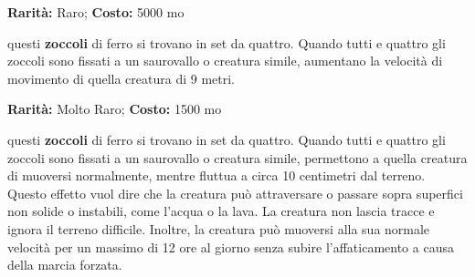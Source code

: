 \begin{multicols}{2}

\textbf{Rarità:} Raro; \textbf{Costo:} 5000 mo

questi \textbf{zoccoli} di ferro si trovano in set da quattro. Quando tutti e quattro gli zoccoli sono fissati a un saurovallo o creatura simile, aumentano la velocità di movimento di quella creatura di 9 metri.


\textbf{Rarità:} Molto Raro; \textbf{Costo:} 1500 mo

questi \textbf{zoccoli} di ferro si trovano in set da quattro. Quando tutti e quattro gli zoccoli sono fissati a un saurovallo o creatura simile, permettono a quella creatura di muoversi normalmente, mentre fluttua a circa 10 centimetri dal terreno. Questo effetto vuol dire che la creatura può attraversare o passare sopra superfici non solide o instabili, come l'acqua o la lava. La creatura non lascia tracce e ignora il terreno difficile. Inoltre, la creatura può muoversi alla sua normale velocità per un massimo di 12 ore al giorno senza subire l'affaticamento a causa della marcia forzata.

\end{multicols}






\pagebreak

